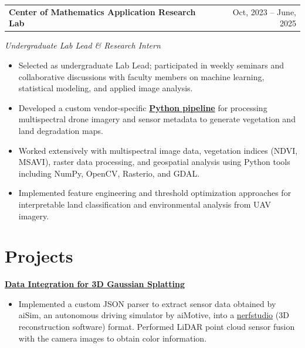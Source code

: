 \documentclass[a4paper,12pt]{article}
\makeatletter
\newenvironment{jobshort}[2]
    {
    \begin{tabularx}{\linewidth}{@{}l X r@{}}
    \textbf{#1} & \hfill &  #2 \\[3.75pt]
    \end{tabularx}
    }
    {
    }
\makeatother
\begin{document}
\begin{jobshort}{Center of Mathematics Application Research Lab}{Oct, 2023 -- June, 2025}
\textit{Undergraduate Lab Lead \& Research Intern} \hfill 

\begin{itemize}[nosep,after=\strut,leftmargin=1em,itemsep=3pt,label=--]


\item Selected as undergraduate Lab Lead; participated in weekly seminars and collaborative discussions with faculty members on machine learning, statistical modeling, and applied image analysis.

\item Developed a custom vendor-specific \href{https://github.com/MendeBadra/BelceeriinDoroitol}{\textbf{Python pipeline}} for processing multispectral drone imagery and sensor metadata to generate vegetation and land degradation maps.

\item Worked extensively with multispectral image data, vegetation indices (NDVI, MSAVI), raster data processing, and geospatial analysis using Python tools including NumPy, OpenCV, Rasterio, and GDAL.

\item Implemented feature engineering and threshold optimization approaches for interpretable land classification and environmental analysis from UAV imagery.


\end{itemize}

\vspace{-1.5em}
\end{jobshort}
\section{Projects}

\noindent

\href{https://github.com/MendeBadra/aisim2nerfstudio}
{\textbf{Data Integration for 3D Gaussian Splatting}}

\begin{itemize}[nosep,after=\strut,leftmargin=1em,itemsep=3pt,label=--]

  \item Implemented a custom JSON parser to extract sensor data obtained by aiSim, an autonomous driving simulator by aiMotive, into a \href{https://docs.nerf.studio/}{nerfstudio} (3D reconstruction software) format. Performed LiDAR point cloud sensor fusion with the camera images to obtain color information.
\end{itemize}
\end{document}
